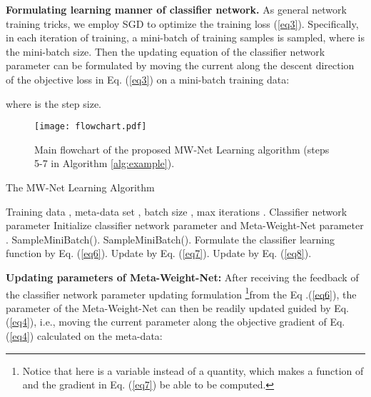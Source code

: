 \documentclass{article}
\begin{document}
	
	\textbf{Formulating learning manner of classifier network.}
	As general network training tricks, we employ SGD to optimize the training loss (\ref{eq3}).
	Specifically, in each iteration of training, a mini-batch of training samples  is sampled, where  is the mini-batch size. Then the updating equation of the classifier network parameter can be formulated by moving the current  along the descent direction of the objective loss in Eq. (\ref{eq3}) on a mini-batch training data:   \vspace{-4mm}
	
	where  is the step size. 
	
	
	\begin{figure*}[t]
\texttt{[image: flowchart.pdf]}\\ \vspace{-4mm}
		\caption{Main flowchart of the proposed MW-Net Learning algorithm (steps 5-7 in Algorithm \ref{alg:example}).}\label{fig1}  \vspace{0mm}
	\end{figure*}
	
	\begin{algorithm}[h]
		\vspace{0mm}
		\renewcommand{\algorithmicrequire}{\textbf{Input:}}
		\renewcommand{\algorithmicensure}{\textbf{Output:}}
		\caption{The MW-Net Learning Algorithm}
		\label{alg:example}
		\begin{algorithmic}[1]  \small
\REQUIRE  Training data , meta-data set , batch size , max iterations .
			\ENSURE  Classifier network parameter 
\STATE Initialize classifier network parameter  and Meta-Weight-Net parameter .
			\STATE  SampleMiniBatch().
			\STATE  SampleMiniBatch().
			\STATE Formulate the classifier learning function  by Eq. (\ref{eq6}).
			\STATE Update  by Eq. (\ref{eq7}).
			\STATE Update  by Eq. (\ref{eq8}).
			\ENDFOR
\end{algorithmic}
	\end{algorithm}
	\vspace{2mm}
	
	\textbf{Updating parameters of Meta-Weight-Net:} After receiving the feedback of the classifier network parameter updating formulation  \footnote{Notice that  here is a variable instead of a quantity, which makes  a function of  and the gradient in Eq. (\ref{eq7}) be able to be computed.}from the Eq .(\ref{eq6}), the parameter  of the Meta-Weight-Net can then be readily updated guided by Eq. (\ref{eq4}), i.e., moving the current parameter  along the objective gradient of Eq. (\ref{eq4}) calculated on the meta-data:
\end{document}

